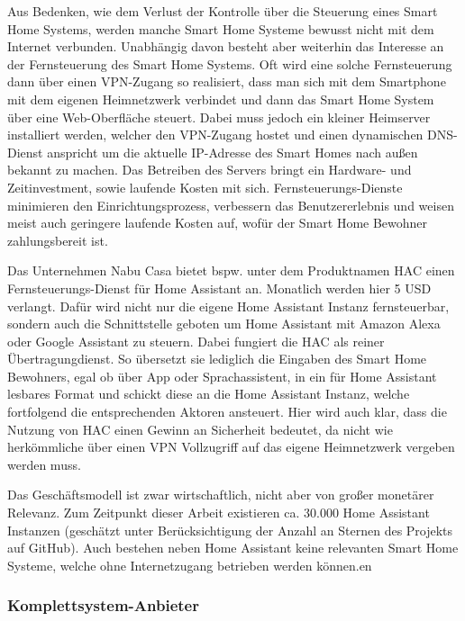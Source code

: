Aus Bedenken, wie dem Verlust der Kontrolle über die Steuerung eines Smart Home Systems, werden manche Smart Home Systeme bewusst nicht mit dem Internet verbunden.
Unabhängig davon besteht aber weiterhin das Interesse an der Fernsteuerung des Smart Home Systems.
Oft wird eine solche Fernsteuerung dann über einen \ac{VPN}-Zugang so realisiert, dass man sich mit dem Smartphone mit dem eigenen Heimnetzwerk verbindet und dann das Smart Home System über eine Web-Oberfläche steuert.
Dabei muss jedoch ein kleiner Heimserver installiert werden, welcher den \ac{VPN}-Zugang hostet und einen dynamischen \ac{DNS}-Dienst anspricht um die aktuelle IP-Adresse des Smart Homes nach außen bekannt zu machen.
Das Betreiben des Servers bringt ein Hardware- und Zeitinvestment, sowie laufende Kosten mit sich.
Fernsteuerungs-Dienste minimieren den Einrichtungsprozess, verbessern das Benutzererlebnis und weisen meist auch geringere laufende Kosten auf, wofür der Smart Home Bewohner zahlungsbereit ist.

Das Unternehmen Nabu Casa bietet bspw. unter dem Produktnamen \ac{HAC} einen Fernsteuerungs-Dienst für Home Assistant an.
Monatlich werden hier 5 USD verlangt.
Dafür wird nicht nur die eigene Home Assistant Instanz fernsteuerbar, sondern auch die Schnittstelle geboten um Home Assistant mit Amazon Alexa oder Google Assistant zu steuern.
Dabei fungiert die \ac{HAC} als reiner Übertragungdienst.
So übersetzt sie lediglich die Eingaben des Smart Home Bewohners, egal ob über App oder Sprachassistent, in ein für Home Assistant lesbares Format und schickt diese an die Home Assistant Instanz, welche fortfolgend die entsprechenden Aktoren ansteuert.
Hier wird auch klar, dass die Nutzung von \ac{HAC} einen Gewinn an Sicherheit bedeutet, da nicht wie herkömmliche über einen \ac{VPN} Vollzugriff auf das eigene Heimnetzwerk vergeben werden muss.

Das Geschäftsmodell ist zwar wirtschaftlich, nicht aber von großer monetärer Relevanz.
Zum Zeitpunkt dieser Arbeit existieren ca. 30.000 Home Assistant Instanzen (geschätzt unter Berücksichtigung der Anzahl an Sternen des Projekts auf GitHub).
Auch bestehen neben Home Assistant keine relevanten Smart Home Systeme, welche ohne Internetzugang betrieben werden können.en

\subsubsection{Komplettsystem-Anbieter}

